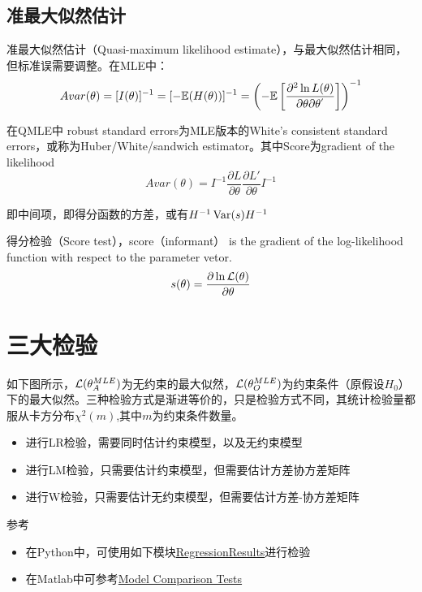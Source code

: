 \documentclass[11pt]{article}
\begin{document}
\subsection{准最大似然估计}

准最大似然估计（Quasi-maximum likelihood estimate），与最大似然估计相同，但标准误需要调整。在MLE中：
\begin{equation*}
    Avar(\theta) = [I(\theta)]^{-1} =  [-\mathbb{E}(H(\theta))]^{-1} = \left(-\mathbb{E} \left[ \frac{\partial^2 \ln L(\theta)}{\partial \theta \partial \theta^{'}}\right] \right)^{-1}
\end{equation*}

在QMLE中 robust standard errors为MLE版本的White's consistent standard errors，或称为Huber/White/sandwich estimator。其中Score为gradient of the likelihood
\begin{equation*}
    Avar(\theta) = I^{-1} \frac{\partial L}{\partial \theta}\frac{\partial L'}{\partial \theta} I^{-1}
\end{equation*}

即中间项，即得分函数的方差，或有$H^{-1} \operatorname{Var}(s) H^{-1}$

得分检验（Score test），score（informant） is the gradient of the log-likelihood function with respect to the parameter vetor.
\begin{equation*}
    s(\theta) = \frac{\partial \ln \mathcal{L}(\theta)}{\partial \theta}
\end{equation*}

\section{三大检验}

如下图所示，$\mathcal{L}(\theta_A^{MLE})$为无约束的最大似然，$\mathcal{L}(\theta_O^{MLE})$为约束条件（原假设$H_0$）下的最大似然。三种检验方式是渐进等价的，只是检验方式不同，其统计检验量都服从卡方分布$\chi^2(m)$,其中$m$为约束条件数量。

\begin{itemize}
    \item 进行LR检验，需要同时估计约束模型，以及无约束模型
    \item 进行LM检验，只需要估计约束模型，但需要估计方差协方差矩阵
    \item 进行W检验，只需要估计无约束模型，但需要估计方差-协方差矩阵
\end{itemize}

\begin{remark}
    参考
    \begin{itemize}
        \item 在Python中，可使用如下模块\href{https://www.statsmodels.org/stable/generated/statsmodels.regression.linear_model.RegressionResults.html}{RegressionResults}进行检验
        \item 在Matlab中可参考\href{https://www.mathworks.com/help/econ/model-comparison-tests.html}{Model Comparison Tests}
    \end{itemize}
\end{remark}
\end{document}
